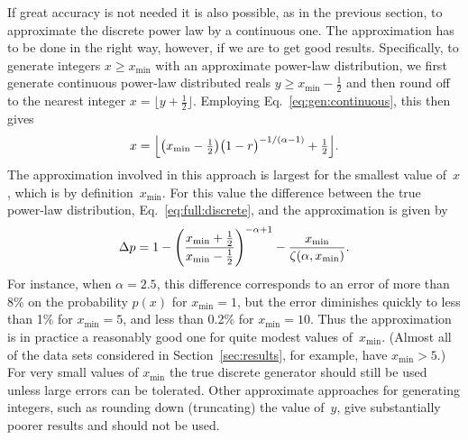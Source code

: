 \documentclass[final]{siamltex}
\newcommand{\half}{\mbox{$\frac12$}}
\newcommand{\xmin}{\ensuremath{x_{\min}}}
\begin{document}
\begin{appendix}
If great accuracy is not needed it is also possible, as in the previous
section, to approximate the discrete power law by a continuous one.  The
approximation has to be done in the right way, however, if we are to get
good results.  Specifically, to generate integers $x\ge \xmin$ with an
approximate power-law distribution, we first generate continuous power-law
distributed reals $y\ge \xmin-\half$ and then round off to the nearest
integer $x=\bigl\lfloor y+\half\bigr\rfloor$.  Employing
Eq.~\eqref{eq:gen:continuous}, this then gives
\begin{equation}
x = \Bigl\lfloor \bigl( \xmin - \half \bigr) 
   \bigl(1-r\bigr)^{-1/(\alpha-1)} + \half \Bigr\rfloor.
\label{eq:cdfcontapp}
\end{equation}
The approximation involved in this approach is largest for the smallest
value of~$x$, which is by definition~$\xmin$.  For this value the
difference between the true power-law distribution,
Eq.~\eqref{eq:full:discrete}, and the approximation is given by
\begin{equation}
\Delta p = 1 - \Biggl( {\xmin+\frac12\over \xmin-\frac12}
              \Biggr)^{-\alpha+1} -
          {\xmin\over\zeta(\alpha,\xmin)}.
\end{equation}
For instance, when $\alpha=2.5$, this difference corresponds to an error of
more than 8\% on the probability $p(x)$ for $\xmin=1$, but the error
diminishes quickly to less than 1\% for $\xmin=5$, and less than 0.2\% for
$\xmin=10$.  Thus the approximation is in practice a reasonably good one
for quite modest values of~$\xmin$.  (Almost all of the data sets
considered in Section~\ref{sec:results}, for example, have $\xmin>5$.)  For
very small values of $\xmin$ the true discrete generator should still be
used unless large errors can be tolerated.  Other approximate approaches
for generating integers, such as rounding down (truncating) the value
of~$y$, give substantially poorer results and should not be used.


\end{appendix}
\end{document}
